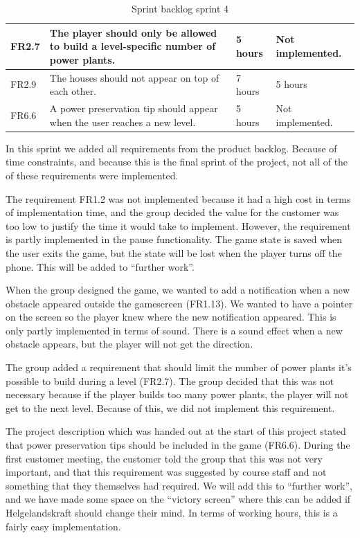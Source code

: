 \begin{table} [H]
\begin{tabular}{| p{1cm} | p{7cm} | p{2cm} | p{2cm} |}
		FR2.7 & The player should only be allowed to build a level-specific number of power plants. 
		& 5 hours & Not implemented.  \\ \hline

		FR2.9 & The houses should not appear on top of each other. 
		& 7 hours & 5 hours \\ \hline
		
		FR6.6 & A power preservation tip should appear when the user reaches a new level. 
		& 5 hours & Not implemented. \\ \hline

	\end{tabular}
	\caption{Sprint backlog sprint 4}
	\end{table}

	In this sprint we added all requirements from the product backlog. Because of time constraints,
	and because this is the final sprint of the project, not all of the of these requirements were
	implemented.

	The requirement FR1.2 was not implemented because it had a high cost in terms of implementation
	time, and the group decided the value for the customer was too low to justify the time it would
	take to implement. However, the requirement is partly implemented in the pause functionality.
	The game state is saved when the user exits the game, but the state will be lost when the player
	turns off the phone. This will be added to ``further work''.

	When the group designed the game, we wanted to add a notification when a new obstacle appeared
	outside the gamescreen (FR1.13). We wanted to have a pointer on the screen so the player knew
	where the new notification appeared. This is only partly implemented in terms of sound. There
	is a sound effect when a new obstacle appears, but the player will not get the direction.

	The group added a requirement that should limit the number of power plants it's possible to
	build during a level (FR2.7). The group decided that this was not necessary because if the
	player builds too many power plants, the player will not get to the next level. Because of this,
	we did not implement this requirement.

	The project description which was handed out at the start of this project stated that power
	preservation tips should be included in the game (FR6.6). During the first customer meeting,
	the customer told the group that this was not very important, and that this requirement was
	suggested by course staff and not something that they themselves had required. We will add
	this to ``further work'', and we have made some space on the ``victory screen'' where this can
	be added if Helgelandskraft should change their mind. In terms of working hours, this is a
	fairly easy implementation.

